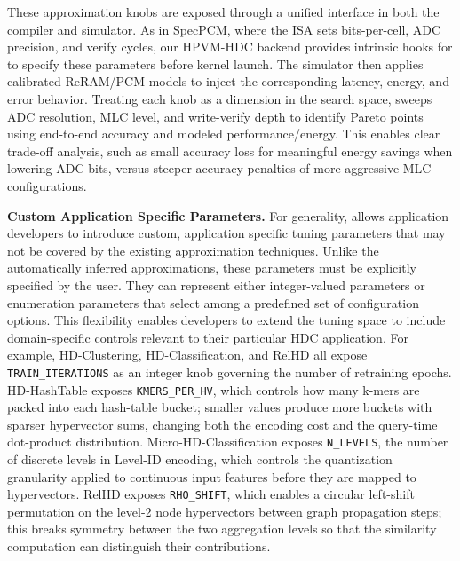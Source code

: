 
These approximation knobs are exposed through a unified interface in both the compiler and simulator. As in SpecPCM, where the ISA sets bits-per-cell, ADC precision, and verify cycles, our HPVM-HDC backend provides intrinsic hooks for \pname{} to specify these parameters before kernel launch. The simulator then applies calibrated ReRAM/PCM models to inject the corresponding latency, energy, and error behavior. Treating each knob as a dimension in the search space, \pname{} sweeps ADC resolution, MLC level, and write-verify depth to identify Pareto points using end-to-end accuracy and modeled performance/energy. This enables clear trade-off analysis, such as small accuracy loss for meaningful energy savings when lowering ADC bits, versus steeper accuracy penalties of more aggressive MLC configurations.








 \textbf{Custom Application Specific Parameters.} 
For generality, \pname{} allows application developers to introduce custom, application specific tuning parameters that may not be covered by the existing approximation techniques. Unlike the automatically inferred approximations, these parameters must be explicitly specified by the user. They can represent either integer-valued parameters or enumeration parameters that select among a predefined set of configuration options. This flexibility enables developers to extend the tuning space to include domain-specific controls relevant to their particular HDC application. For example, HD-Clustering, HD-Classification, and RelHD all expose \texttt{TRAIN\_ITERATIONS} as an integer knob governing the number of retraining epochs. HD-HashTable exposes \texttt{KMERS\_PER\_HV}, which controls how many k-mers are packed into each hash-table bucket; smaller values produce more buckets with sparser hypervector sums, changing both the encoding cost and the query-time dot-product distribution. Micro-HD-Classification exposes \texttt{N\_LEVELS}, the number of discrete levels in Level-ID encoding, which controls the quantization granularity applied to continuous input features before they are mapped to hypervectors. RelHD exposes \texttt{RHO\_SHIFT}, which enables a circular left-shift permutation on the level-2 node hypervectors between graph propagation steps; this breaks symmetry between the two aggregation levels so that the similarity computation can distinguish their contributions.

